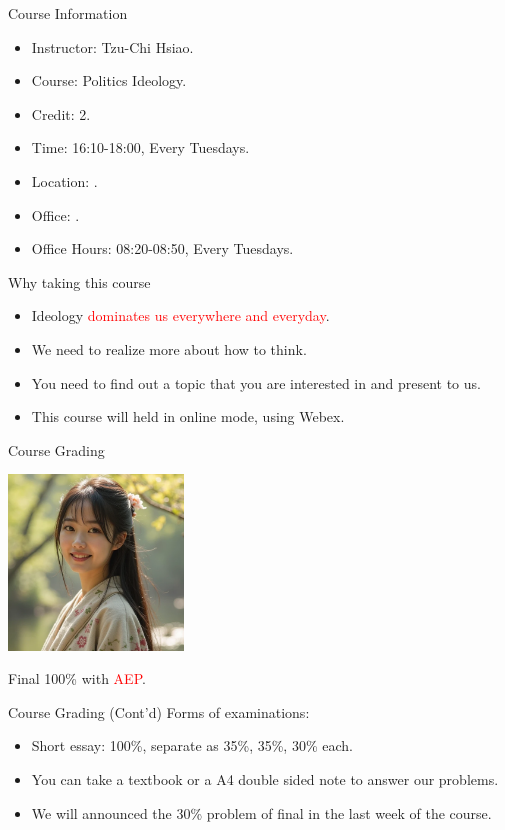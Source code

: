 \documentclass{beamer}
\begin{document}
\begin{frame}{Course Information}
\begin{itemize}
\item Instructor: Tzu-Chi Hsiao.
\item Course: Politics Ideology.
\item Credit: 2.
\item Time: 16:10-18:00, Every Tuesdays.
\item Location: . 
\item Office: .
\item Office Hours: 08:20-08:50, Every Tuesdays.
\end{itemize}
\end{frame}
\begin{frame}{Why taking this course}
\begin{itemize}
\item Ideology \textcolor{red}{dominates us everywhere and everyday}.
\item We need to realize more about how to think.
\item You need to find out a topic that you are interested in and present to us.
\item This course will held in online mode, using Webex.
\end{itemize}
\end{frame}
\begin{frame}{Course Grading}
\begin{center}
\includegraphics[width=0.35\textwidth]{examination.png}
\end{center}
\begin{center}
Final 100\% with \textcolor{red}{AEP}.
\end{center}
\end{frame}
\begin{frame}{Course Grading (Cont'd)}
Forms of examinations:
\begin{itemize}
\item Short essay: 100\%, separate as 35\%, 35\%, 30\% each.
\item You can take a textbook or a A4 double sided note to answer our problems.
\item We will announced the 30\% problem of final in the last week of the course.
\end{itemize}
\end{frame}
\end{document}
